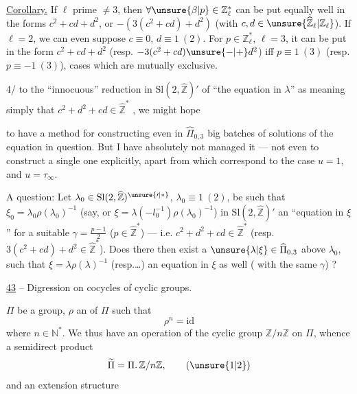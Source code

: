\uline{Corollary.}  If $\ell$  prime $\ne3$, then $\forall\unsure{\beta|p}\in\mathbb Z_\ell^{*}$ can be put equally well in the forms $c^2+cd+d^2$, or $-(3(c^2+cd)+d^2)$ (with $c,d\in\unsure{\widehat{\mathbb Z}_\ell|\mathbb Z_\ell}$). If $\ell=2$, we can even suppose $c\equiv0$, $d\equiv1\ (2)$. For $p\in\mathbb Z_\ell^{*}$, $\ell=3$, it can be put in the form $c^2+cd+d^2$ (resp. $-3(c^2+cd)\unsure{-|+}d^2$) iff $p\equiv1\ (3)$ (resp. $p\equiv-1\ (3)$), cases which are mutually exclusive.

4/  to the ``innocuous'' reduction in $\mathrm{Sl}(2,\widehat{\mathbb Z})'$ of ``the equation in $\lambda$'' as meaning simply that $c^2+d^2+cd\in\widehat{\mathbb Z}^{*}$ , we might hope


to have a method for constructing even in $\widehat{\Pi}_{0,3}$ big batches of solutions of the equation in question. But I have absolutely not managed it --- not even to construct a single one explicitly, apart from  which correspond to the case $u=1$, and $u=\tau_\infty$.

A question: Let $\lambda_0\in\mathrm{Sl}(2,\widehat{\mathbb Z})^{\unsure{\prime|*}}$, $\lambda_0\equiv1\ (2)$, be such that $\xi_0=\lambda_0\rho(\lambda_0)^{-1}$ (say, or $\xi=\lambda(-l_0^{-1})\rho(\lambda_0)^{-1}$)   in $\mathrm{Sl}(2,\widehat{\mathbb Z})'$ an ``equation in $\xi$'' for a suitable $\gamma=\frac{p-1}{2}$ ($p\in\widehat{\mathbb Z}^{*}$) --- i.e. $c^2+d^2+cd\in\widehat{\mathbb Z}^{*}$ (resp. $3(c^2+cd)+d^2\in\widehat{\mathbb Z}^{*}$). Does there then exist a $\unsure{\lambda|\xi}\in\widehat{\Pi}_{0,3}$ above $\lambda_0$, such that $\xi=\lambda\rho(\lambda)^{-1}$ (resp.\ldots)  an equation in $\xi$ as well ( with the same $\gamma$) ?


\uline{43}  -- Digression on cocycles of cyclic groups.

 $\Pi$ be a group, $\rho$ an  of $\Pi$ such that
\[
\rho^n=\mathrm{id} \tag{1}
\]
where $n\in\mathbb N^*$. We thus have an operation of the cyclic group $\mathbb Z/n\mathbb Z$ on $\Pi$, whence a semidirect product
\[
\widetilde\Pi=\Pi.\,\mathbb Z/n\mathbb Z, \tag{\unsure{1|2}}
\]
and an extension structure

